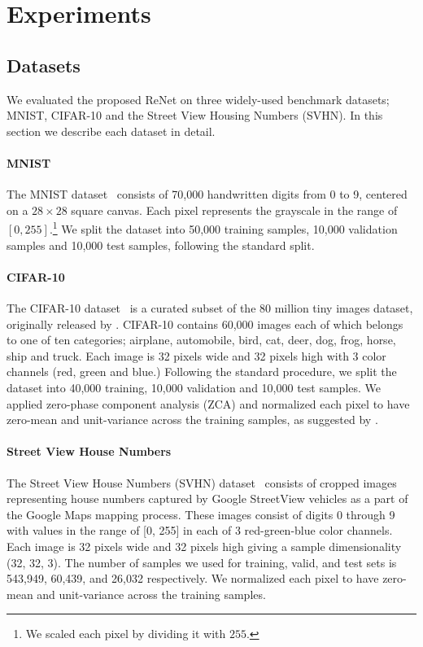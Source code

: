 \documentclass{article} \usepackage{nips15submit_e,times}
\begin{document}
\section{Experiments}

\subsection{Datasets}

We evaluated the proposed ReNet on three widely-used benchmark datasets; MNIST,
CIFAR-10 and the Street View Housing Numbers (SVHN). In this section we describe 
each dataset in detail.

\paragraph{MNIST}
The MNIST dataset~\citep{Lecun99objectrecognition} consists of 70,000
handwritten digits from 0 to 9, centered on a $28\times 28$ square canvas. Each
pixel represents the grayscale in the range of $\left[0, 255\right]$.\footnote{
    We scaled each pixel by dividing it with $255$.
} 
We split the dataset into 50,000 training samples, 10,000 validation
samples and 10,000 test samples, following the standard split.

\paragraph{CIFAR-10}
The CIFAR-10 dataset~\citep{KrizhevskyHinton2009} is a curated subset of the 80
million tiny images dataset, originally released by
\citet{Torralba+Fergus+Freeman-2008}. CIFAR-10 contains 60,000 images each of which
belongs to one of ten categories; airplane, automobile, bird, cat, deer, dog,
frog, horse, ship and truck. Each image is 32 pixels wide and 32 pixels high
with 3 color channels (red, green and blue.) Following the standard procedure,
we split the dataset into 40,000 training, 10,000 validation and 10,000 test
samples. We applied zero-phase component analysis (ZCA) and normalized each pixel
to have zero-mean and unit-variance across the training
samples, as suggested by \citet{KrizhevskyHinton2009}.

\paragraph{Street View House Numbers}
The Street View House Numbers (SVHN) dataset~\citep{Netzer-wkshp-2011} consists 
of cropped images representing house numbers captured by Google StreetView 
vehicles as a part of the Google Maps mapping process. These images consist of
digits 0 through 9 with values in the range of [0, 255] in each of 3
red-green-blue color channels. Each image is 32 pixels wide and 32 pixels
high giving a sample dimensionality (32, 32, 3). The number of samples we used for
training, valid, and test sets is 543,949, 60,439, and 26,032 respectively. We
normalized each pixel to have zero-mean and unit-variance across the training
samples.
\end{document}

